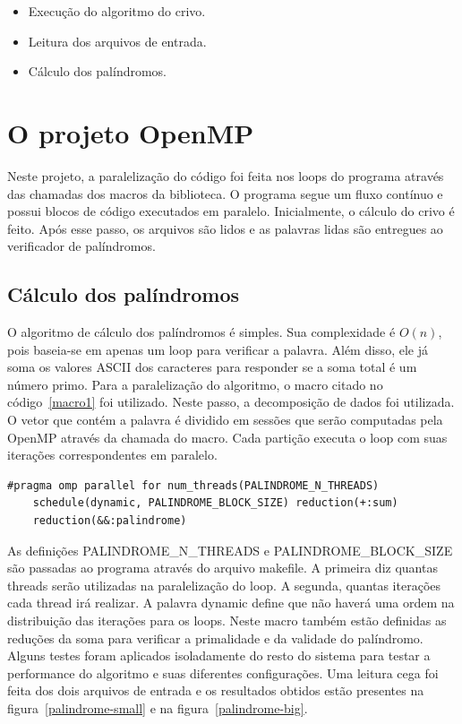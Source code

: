 \documentclass[a4paper]{article}
\begin{document}
\begin{itemize}
	\item Execução do algoritmo do crivo.
	\item Leitura dos arquivos de entrada.
	\item Cálculo dos palíndromos.
\end{itemize}

\section{O projeto OpenMP}
\indent \indent Neste projeto, a paralelização do código foi feita nos loops do programa através das chamadas dos macros da biblioteca. O programa segue um fluxo contínuo e possui blocos de código executados em paralelo. Inicialmente, o cálculo do crivo é feito. Após esse passo, os arquivos são lidos e as palavras lidas são entregues ao verificador de palíndromos.

\subsection{Cálculo dos palíndromos}
\indent \indent O algoritmo de cálculo dos palíndromos é simples. Sua complexidade é \begin{math}O(n)\end{math}, pois baseia-se em apenas um loop para verificar a palavra. Além disso, ele já soma os valores ASCII dos caracteres para responder se a soma total é um número primo. Para a paralelização do algoritmo, o macro citado no código~\ref{macro1} foi utilizado. Neste passo, a decomposição de dados foi utilizada. O vetor que contém a palavra é dividido em sessões que serão computadas pela OpenMP através da chamada do macro. Cada partição executa o loop com suas iterações correspondentes em paralelo.

\begin{lstlisting}[caption=Macro que paraleliza o algoritmo do palíndromo, float=h, label=macro1]
#pragma omp parallel for num_threads(PALINDROME_N_THREADS) 
	schedule(dynamic, PALINDROME_BLOCK_SIZE) reduction(+:sum) 
	reduction(&&:palindrome)
\end{lstlisting}

As definições PALINDROME\_N\_THREADS e PALINDROME\_BLOCK\_SIZE são passadas ao programa através do arquivo makefile. A primeira diz quantas threads serão utilizadas na paralelização do loop. A segunda, quantas iterações cada thread irá realizar. A palavra dynamic define que não haverá uma ordem na distribuição das iterações para os loops. Neste macro também estão definidas as reduções da soma para verificar a primalidade e da validade do palíndromo.\\
\indent Alguns testes foram aplicados isoladamente do resto do sistema para testar a performance do algoritmo e suas diferentes configurações. Uma leitura cega foi feita dos dois arquivos de entrada e os resultados obtidos estão presentes na figura~\ref{palindrome-small} e na figura~\ref{palindrome-big}.\\
\end{document}
